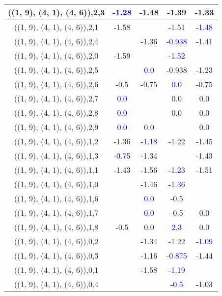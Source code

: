 \documentclass{article}
\begin{document}
\begin{center}
\begin{longtable}{|c|c|c|c|c|}
        	\hline
        	((1, 9), (4, 1), (4, 6)),2,3& \textcolor{blue}{-1.28}&-1.48&-1.39&-1.33\\
        	\hline
        	((1, 9), (4, 1), (4, 6)),2,1&-1.58&&-1.51& \textcolor{blue}{-1.48}\\
        	\hline
        	((1, 9), (4, 1), (4, 6)),2,4&&-1.36& \textcolor{blue}{-0.938}&-1.41\\
        	\hline
        	((1, 9), (4, 1), (4, 6)),2,0&-1.59&& \textcolor{blue}{-1.52}&\\
        	\hline
        	((1, 9), (4, 1), (4, 6)),2,5&& \textcolor{blue}{0.0}&-0.938&-1.23\\
        	\hline
        	((1, 9), (4, 1), (4, 6)),2,6&-0.5&-0.75& \textcolor{blue}{0.0}&-0.75\\
        	\hline
        	((1, 9), (4, 1), (4, 6)),2,7& \textcolor{blue}{0.0}&&0.0&0.0\\
        	\hline
        	((1, 9), (4, 1), (4, 6)),2,8& \textcolor{blue}{0.0}&&0.0&0.0\\
        	\hline
        	((1, 9), (4, 1), (4, 6)),2,9& \textcolor{blue}{0.0}&0.0&&0.0\\
        	\hline
        	((1, 9), (4, 1), (4, 6)),1,2&-1.36& \textcolor{blue}{-1.18}&-1.22&-1.45\\
        	\hline
        	((1, 9), (4, 1), (4, 6)),1,3& \textcolor{blue}{-0.75}&-1.34&&-1.43\\
        	\hline
        	((1, 9), (4, 1), (4, 6)),1,1&-1.43&-1.56& \textcolor{blue}{-1.23}&-1.51\\
        	\hline
        	((1, 9), (4, 1), (4, 6)),1,0&&-1.46& \textcolor{blue}{-1.36}&\\
        	\hline
        	((1, 9), (4, 1), (4, 6)),1,6&& \textcolor{blue}{0.0}&-0.5&\\
        	\hline
        	((1, 9), (4, 1), (4, 6)),1,7&& \textcolor{blue}{0.0}&-0.5&0.0\\
        	\hline
        	((1, 9), (4, 1), (4, 6)),1,8&-0.5&0.0& \textcolor{blue}{2.3}&0.0\\
        	\hline
        	((1, 9), (4, 1), (4, 6)),0,2&&-1.34&-1.22& \textcolor{blue}{-1.09}\\
        	\hline
        	((1, 9), (4, 1), (4, 6)),0,3&&-1.16& \textcolor{blue}{-0.875}&-1.44\\
        	\hline
        	((1, 9), (4, 1), (4, 6)),0,1&&-1.58& \textcolor{blue}{-1.19}&\\
        	\hline
        	((1, 9), (4, 1), (4, 6)),0,4&&& \textcolor{blue}{-0.5}&-1.03\\

\end{longtable}
\end{center}
\end{document}
